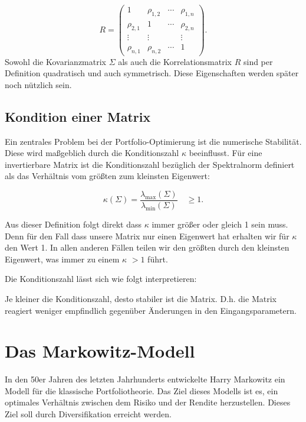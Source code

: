 \documentclass[parskip=half]{scrartcl}
\begin{document}
	\begin{equation}
		R = \begin{pmatrix}
			1 & \rho_{1,2} & \cdots & \rho_{1,n} 	\\
			\rho_{2,1} & 1 & \cdots & \rho_{2,n} 	\\
			\vdots & \vdots &  & \vdots 				\\
			\rho_{n,1} & \rho_{n,2} & \cdots & 1
		\end{pmatrix}. 										\label{eq:korrelationsmatrix}
	\end{equation}
	Sowohl die Kovarianzmatrix $\Sigma$ als auch die Korrelationsmatrix $R$ sind per Definition quadratisch und auch symmetrisch. Diese Eigenschaften werden später noch nützlich sein.
	
	
	\subsection{Kondition einer Matrix}
	Ein zentrales Problem bei der Portfolio-Optimierung ist die numerische Stabilität. Diese wird maßgeblich durch die Konditionszahl $\kappa$ beeinflusst. Für eine invertierbare Matrix ist die Konditionszahl bezüglich der Spektralnorm definiert als das Verhältnis vom größten zum kleinsten Eigenwert:
	
	\begin{equation}
		\kappa(\Sigma) = \frac{\lambda_{\max}(\Sigma)}{\lambda_{\min}(\Sigma)} \quad \geq 1. \label{eq:kondition}
	\end{equation}
	
	Aus dieser Definition folgt direkt dass $\kappa$ immer größer oder gleich 1 sein muss. Denn für den Fall dass unsere Matrix nur einen Eigenwert hat erhalten wir für $\kappa$ den Wert 1. In allen anderen Fällen teilen wir den größten durch den kleinsten Eigenwert, was immer zu einem $\kappa$ $> 1$ führt.
	
	Die Konditionszahl lässt sich wie folgt interpretieren:
	
	Je kleiner die Konditionszahl, desto stabiler ist die Matrix. D.h. die Matrix reagiert weniger empfindlich gegenüber Änderungen in den Eingangsparametern.
	
	\clearpage
	
	\section{Das Markowitz-Modell}
	
	In den 50er Jahren des letzten Jahrhunderts entwickelte Harry Markowitz ein Modell für die klassische Portfoliotheorie. Das Ziel dieses Modells ist es, ein optimales Verhältnis zwischen dem Risiko und der Rendite herzustellen. Dieses Ziel soll durch Diversifikation erreicht werden.
	
\end{document}
